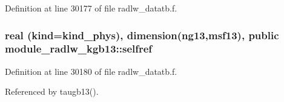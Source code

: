 Definition at line 30177 of file radlw\+\_\+datatb.\+f.

\subsubsection[{\texorpdfstring{selfref}{selfref}}]{\setlength{\rightskip}{0pt plus 5cm}real (kind=kind\+\_\+phys), dimension(ng13,{\bf msf13}), public module\+\_\+radlw\+\_\+kgb13\+::selfref}\hypertarget{namespacemodule__radlw__kgb13_ac8f58bba6aa4b72ffd01f78e60d0831f}{}\label{namespacemodule__radlw__kgb13_ac8f58bba6aa4b72ffd01f78e60d0831f}


Definition at line 30180 of file radlw\+\_\+datatb.\+f.



Referenced by taugb13().

